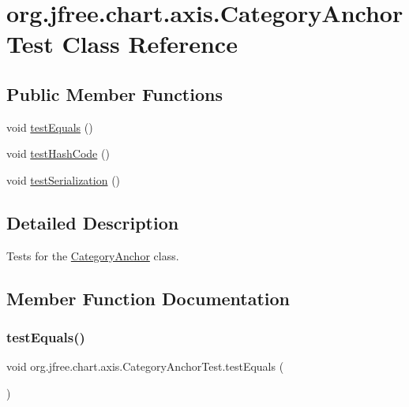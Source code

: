 \hypertarget{classorg_1_1jfree_1_1chart_1_1axis_1_1_category_anchor_test}{}\section{org.\+jfree.\+chart.\+axis.\+Category\+Anchor\+Test Class Reference}
\label{classorg_1_1jfree_1_1chart_1_1axis_1_1_category_anchor_test}
\subsection*{Public Member Functions}
\begin{DoxyCompactItemize}
\item 
void \mbox{\hyperlink{classorg_1_1jfree_1_1chart_1_1axis_1_1_category_anchor_test_a6df13fef3e1019a31e5b9d5124581a43}{test\+Equals}} ()
\item 
void \mbox{\hyperlink{classorg_1_1jfree_1_1chart_1_1axis_1_1_category_anchor_test_aba90f5727afd590697aebb4ddde8aee3}{test\+Hash\+Code}} ()
\item 
void \mbox{\hyperlink{classorg_1_1jfree_1_1chart_1_1axis_1_1_category_anchor_test_aa597c79b5478b21ee4838cd8c1e6e033}{test\+Serialization}} ()
\end{DoxyCompactItemize}


\subsection{Detailed Description}
Tests for the \mbox{\hyperlink{classorg_1_1jfree_1_1chart_1_1axis_1_1_category_anchor}{Category\+Anchor}} class. 

\subsection{Member Function Documentation}
\mbox{\label{classorg_1_1jfree_1_1chart_1_1axis_1_1_category_anchor_test_a6df13fef3e1019a31e5b9d5124581a43}} 
\subsubsection{\texorpdfstring{test\+Equals()}{testEquals()}}
{\footnotesize\ttfamily void org.\+jfree.\+chart.\+axis.\+Category\+Anchor\+Test.\+test\+Equals (\begin{DoxyParamCaption}{ }\end{DoxyParamCaption})}


